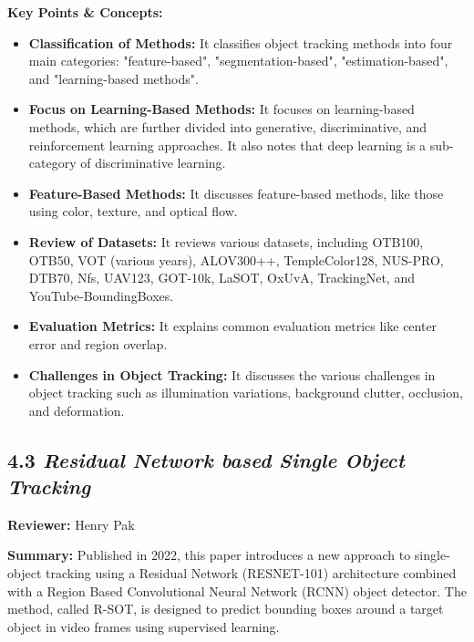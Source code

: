 \documentclass{article}
\begin{document}
\vspace{0.3cm}

\textbf{Key Points \& Concepts:}
\begin{itemize}
  \item \textbf{Classification of Methods:} It classifies object tracking methods into four main categories: "feature-based", "segmentation-based", "estimation-based", and "learning-based methods".
  \item \textbf{Focus on Learning-Based Methods:} It focuses on learning-based methods, which are further divided into generative, discriminative, and reinforcement learning approaches. It also notes that deep learning is a sub-category of discriminative learning.
  \item \textbf{Feature-Based Methods:} It discusses feature-based methods, like those using color, texture, and optical flow.
  \item \textbf{Review of Datasets:} It reviews various datasets, including OTB100, OTB50, VOT (various years), ALOV300++, TempleColor128, NUS-PRO, DTB70, Nfs, UAV123, GOT-10k, LaSOT, OxUvA, TrackingNet, and YouTube-BoundingBoxes.
  \item \textbf{Evaluation Metrics:} It explains common evaluation metrics like center error and region overlap.
  \item \textbf{Challenges in Object Tracking:} It discusses the various challenges in object tracking such as illumination variations, background clutter, occlusion, and deformation.
\end{itemize}
\subsection*{4.3 \textit{Residual Network based Single Object Tracking}}

\hspace*{\parindent}\textbf{Reviewer:} Henry Pak

\vspace{0.3cm}

\textbf{Summary:} Published in 2022, this paper introduces a new approach to single-object tracking using a Residual Network (RESNET-101) architecture combined with a Region Based Convolutional Neural Network (RCNN) object detector. The method, called R-SOT, is designed to predict bounding boxes around a target object in video frames using supervised learning.

\vspace{0.3cm}
\end{document}
